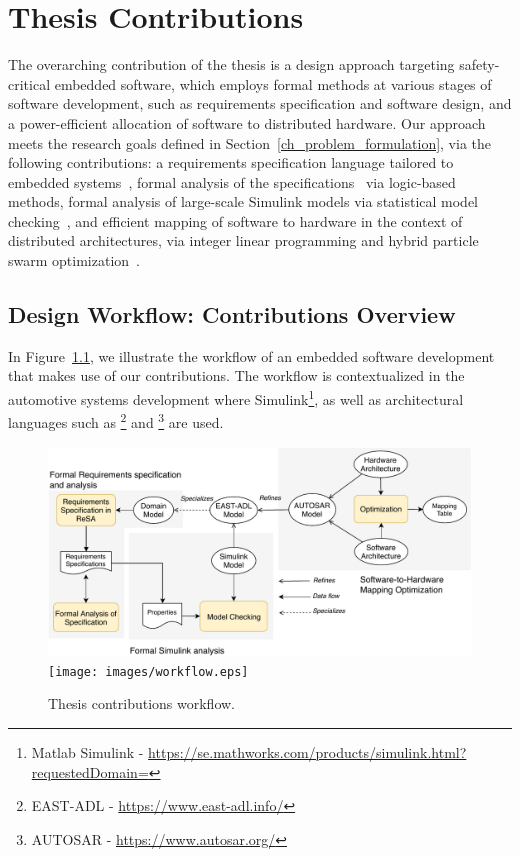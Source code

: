 \chapter{Thesis Contributions}
The overarching contribution of the thesis is a design approach targeting safety-critical embedded software, which employs formal methods at various stages of software development, such as requirements specification and software design, and a power-efficient allocation of software to distributed hardware. Our approach meets the research goals defined in Section~\ref{ch_problem_formulation}, via the following contributions: a requirements specification language tailored to embedded systems~\cite{Mahmud2015ReSA:Systems}, formal analysis of the specifications~\cite{resatool}\cite{Mahmud2017SpecificationLogic} via logic-based methods, formal analysis of large-scale Simulink models via statistical model checking~\cite{Filipovikj2018SimppaalModels}, and efficient mapping of software to hardware in the context of distributed architectures, via integer linear programming and hybrid particle swarm optimization~\cite{Mahmud5222}\cite{Mahmud2019OptimizedConstraints}. 

\section{Design Workflow: Contributions Overview}
In Figure~\ref{fig_workflow}, we illustrate the workflow of an embedded software development that makes use of our contributions. The workflow is contextualized in the automotive systems development where Simulink\footnote{Matlab Simulink - \url{https://se.mathworks.com/products/simulink.html?requestedDomain=}}, as well as architectural languages such as \eastadl\footnote{EAST-ADL - \url{https://www.east-adl.info/}} and \autosar\footnote{AUTOSAR - \url{https://www.autosar.org/}} are used.
\begin{figure}
	\centering
	\ifpdf
	\includegraphics[width=\linewidth]{images/workflow}
	\else
	\texttt{[image: images/workflow.eps]}
	\fi
	\caption{Thesis contributions workflow.} 
	\label{fig_workflow}
\end{figure}

